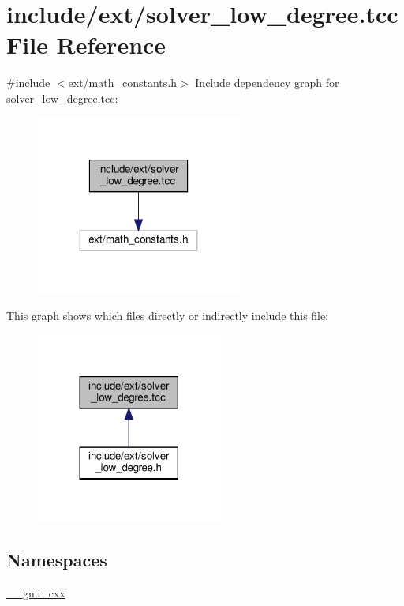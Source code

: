 \hypertarget{solver__low__degree_8tcc}{}\section{include/ext/solver\+\_\+low\+\_\+degree.tcc File Reference}
\label{solver__low__degree_8tcc}
{\ttfamily \#include $<$ext/math\+\_\+constants.\+h$>$}\newline
Include dependency graph for solver\+\_\+low\+\_\+degree.\+tcc\+:
\nopagebreak
\begin{figure}[H]
\begin{center}
\leavevmode
\includegraphics[width=191pt]{solver__low__degree_8tcc__incl}
\end{center}
\end{figure}
This graph shows which files directly or indirectly include this file\+:
\nopagebreak
\begin{figure}[H]
\begin{center}
\leavevmode
\includegraphics[width=173pt]{solver__low__degree_8tcc__dep__incl}
\end{center}
\end{figure}
\subsection*{Namespaces}
\begin{DoxyCompactItemize}
\item 
 \hyperlink{namespace____gnu__cxx}{\+\_\+\+\_\+gnu\+\_\+cxx}
\end{DoxyCompactItemize}
